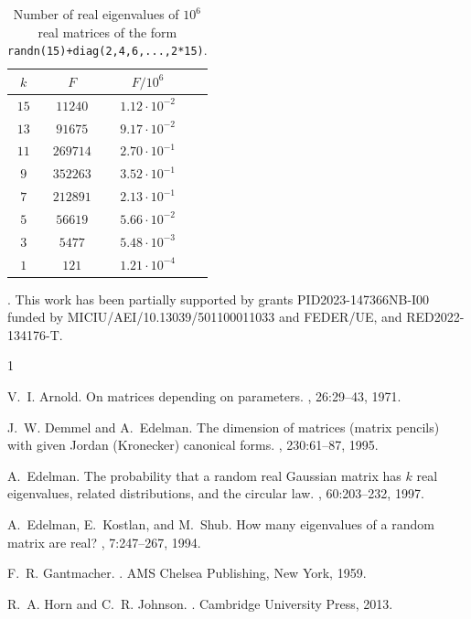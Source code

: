 \documentclass[a4paper]{article}
\begin{document}
\begin{table}[]
    \centering
    \begin{tabular}{|c|c|c|c|}\hline
    $k$&$F$&$F/10^6$\\\hline\hline
    $15$&$11240$&$1.12\cdot10^{-2}$\\
    $13$&$91675$&$9.17\cdot10^{-2}$\\
         $11$&$269714$&$2.70\cdot10^{-1}$\\ $9$ & $352263$&$3.52\cdot10^{-1}$ \\
 $7$ & $212891$&$2.13\cdot10^{-1}$ \\
 $5$ & $56619$&$5.66\cdot10^{-2}$ \\$3$ &$5477$&$5.48\cdot10^{-3}$  \\
         $1$& $121$&$1.21\cdot10^{-4}$\\\hline
    \end{tabular}
    \caption{Number of real eigenvalues of $10^6$ real matrices of the form \texttt{randn(15)+diag(2,4,6,...,2*15)}.}
    \label{trick.table}
\end{table}


\bigskip

. This work has been partially supported by grants PID2023-147366NB-I00 funded by MICIU/AEI/10.13039/501100011033 and FEDER/UE, and RED2022-134176-T.


%

\begin{thebibliography}{1}

V.~I. Arnold.
\newblock On matrices depending on parameters.
, 26:29--43, 1971.

J.~W. Demmel and A.~Edelman.
\newblock The dimension of matrices (matrix pencils) with given {Jordan
  (Kronecker)} canonical forms.
, 230:61--87, 1995.

A.~Edelman.
\newblock The probability that a random real {G}aussian matrix has $k$ real
  eigenvalues, related distributions, and the circular law.
, 60:203--232, 1997.

A.~Edelman, E.~Kostlan, and M.~Shub.
\newblock How many eigenvalues of a random matrix are real?
, 7:247--267, 1994.

F.~R. Gantmacher.
.
\newblock AMS Chelsea Publishing, New York, 1959.

R.~A. Horn and C.~R. Johnson.
.
\newblock Cambridge University Press, 2013.

\end{thebibliography}
\end{document}
